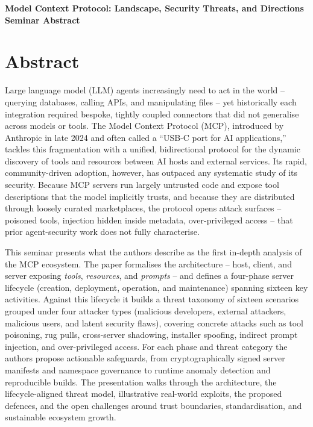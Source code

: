 \documentclass[11pt]{article}
\begin{document}
\begin{center}
{\LARGE\bfseries Model Context Protocol: Landscape, Security Threats, and Directions}\\[1.1em]
{\large\bfseries Seminar Abstract}\\[0.6em]
{\normalsize \seminarDate}
\end{center}
\vspace{0.6em}
\section*{Abstract}
Large language model (LLM) agents increasingly need to act in the world -- querying databases, calling APIs, and manipulating files -- yet historically each integration required bespoke, tightly coupled connectors that did not generalise across models or tools. The Model Context Protocol (MCP), introduced by Anthropic in late 2024 and often called a ``USB-C port for AI applications,'' tackles this fragmentation with a unified, bidirectional protocol for the dynamic discovery of tools and resources between AI hosts and external services. Its rapid, community-driven adoption, however, has outpaced any systematic study of its security. Because MCP servers run largely untrusted code and expose tool descriptions that the model implicitly trusts, and because they are distributed through loosely curated marketplaces, the protocol opens attack surfaces -- poisoned tools, injection hidden inside metadata, over-privileged access -- that prior agent-security work does not fully characterise.

This seminar presents what the authors describe as the first in-depth analysis of the MCP ecosystem. The paper formalises the architecture -- host, client, and server exposing \emph{tools}, \emph{resources}, and \emph{prompts} -- and defines a four-phase server lifecycle (creation, deployment, operation, and maintenance) spanning sixteen key activities. Against this lifecycle it builds a threat taxonomy of sixteen scenarios grouped under four attacker types (malicious developers, external attackers, malicious users, and latent security flaws), covering concrete attacks such as tool poisoning, rug pulls, cross-server shadowing, installer spoofing, indirect prompt injection, and over-privileged access. For each phase and threat category the authors propose actionable safeguards, from cryptographically signed server manifests and namespace governance to runtime anomaly detection and reproducible builds. The presentation walks through the architecture, the lifecycle-aligned threat model, illustrative real-world exploits, the proposed defences, and the open challenges around trust boundaries, standardisation, and sustainable ecosystem growth.
\end{document}
